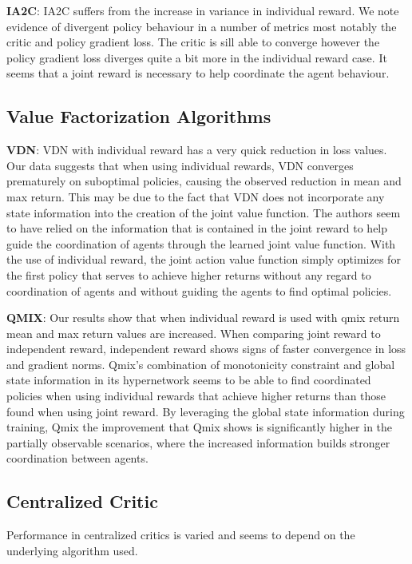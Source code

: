 \documentclass[systems,article,submit,pdftex,moreauthors]{Definitions/mdpi}
\begin{document}
\textbf{IA2C}: IA2C suffers from the increase in variance in individual reward. We note evidence of divergent policy behaviour in a number of metrics most notably the critic and policy gradient loss. The critic is sill able to converge however the policy gradient loss diverges quite a bit more in the individual reward case. It seems that a joint reward is necessary to help coordinate the agent behaviour.     


\subsection{Value Factorization Algorithms}

\textbf{VDN}:
VDN with individual reward has a very quick reduction in loss values. Our data suggests that when using individual rewards, VDN converges prematurely on suboptimal policies, causing the observed reduction in mean and max return. This may be due to the fact that VDN does not incorporate any state information into the creation of the joint value function. The authors seem to have relied on the information that is contained in the joint reward to help guide the coordination of agents through the learned joint value function. With the use of individual reward, the joint action value function simply optimizes for the first policy that serves to achieve higher returns without any regard to coordination of agents and without guiding the agents to find optimal policies. 

\textbf{QMIX}: 
Our results show that when individual reward is used with qmix return mean and max return values are increased.  When comparing joint reward to independent reward, independent reward shows signs of faster convergence in loss and gradient norms. Qmix’s combination of monotonicity constraint and global state information in its hypernetwork seems to be able to find coordinated policies when using individual rewards that achieve higher returns than those found when using joint reward. By leveraging the global state information during training, Qmix the improvement that Qmix shows is significantly higher in the partially observable scenarios, where the increased information builds stronger coordination between agents.  

\subsection{Centralized Critic}
Performance in centralized critics is varied and seems to depend on the underlying algorithm used. 
\end{document}
